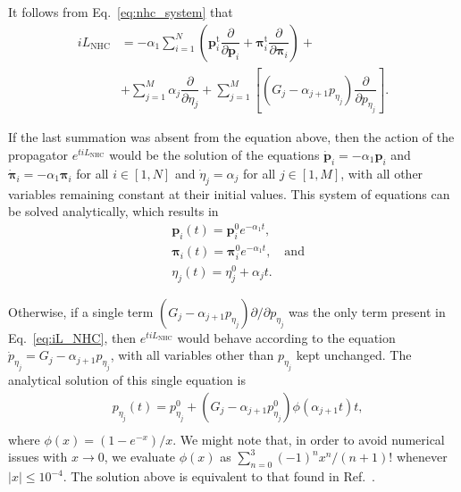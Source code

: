 \documentclass[aip,jcp,reprint,amsmath,amssymb]{revtex4-1}
\newcommand{\vt}[1]{\boldsymbol{\mathbf{#1}}}           %
\newcommand{\tr}[1]{#1^\text{t}}                               %
\newcommand{\diff}[2]{\dfrac{\partial #1}{\partial #2}} %
\begin{document}
It follows from Eq.~\ref{eq:nhc_system} that
\begin{equation}
\label{eq:iL_NHC}
\begin{split}
i\!L_\text{NHC} &= -\alpha_1 \sum_{i=1}^N \left( \tr{\vt p}_i \diff{}{\vt p_i} + \tr{\vt \pi}_i \diff{}{\vt \pi_i}\right) + \\
&+ \sum_{j=1}^M \alpha_j \diff{}{\eta_j} + \sum_{j=1}^M \left[ (G_j - \alpha_{j+1} p_{\eta_j}) \diff{}{p_{\eta_j}} \right].
\end{split}
\end{equation}

If the last summation was absent from the equation above, then the action of the propagator $e^{t i\!L_\text{NHC}}$ would be the solution of the equations $\dot{\vt p}_i = -\alpha_1 \vt p_i$ and $\dot{\vt \pi}_i = -\alpha_1 \vt \pi_i$ for all $i \in [1,N]$ and $\dot{\eta}_j = \alpha_j$ for all $j \in [1,M]$, with all other variables remaining constant at their initial values. This system of equations can be solved analytically, which results in
\begin{subequations}
\begin{align}
&\vt p_i(t) = \vt p_i^0 e^{-\alpha_1 t}, \\
&\vt \pi_i(t) = \vt \pi_i^0 e^{-\alpha_1 t}, \quad \text{and}\\
&\eta_j(t) = \eta_j^0 + \alpha_j t. \label{eq:solution_eta}
\end{align}
\end{subequations}

Otherwise, if a single term $(G_j - \alpha_{j+1} p_{\eta_j}) \partial/\partial p_{\eta_j}$ was the only term present in Eq.~\ref{eq:iL_NHC}, then $e^{t i\!L_\text{NHC}}$ would behave according to the equation $\dot{p}_{\eta_j} = G_j - \alpha_{j+1} p_{\eta_j}$, with all variables other than $p_{\eta_j}$ kept unchanged. The analytical solution of this single equation is
\begin{equation}
\label{eq:solution_p_eta}
\begin{split}
&p_{\eta_j}(t) = p_{\eta_j}^0 + \left( G_j - \alpha_{j+1} p_{\eta_j}^0 \right) \phi\left(\alpha_{j+1} t\right) t, \\
\end{split}
\end{equation}
where $\phi(x) = (1-e^{-x})/x$. We might note that, in order to avoid numerical issues with $x \rightarrow 0$, we evaluate $\phi(x)$ as $\sum_{n=0}^3 {(-1)^n x^n}/{(n+1)!}$ whenever $|x| \leq 10^{-4}$. The solution above is equivalent to that found in Ref.~.
\end{document}
